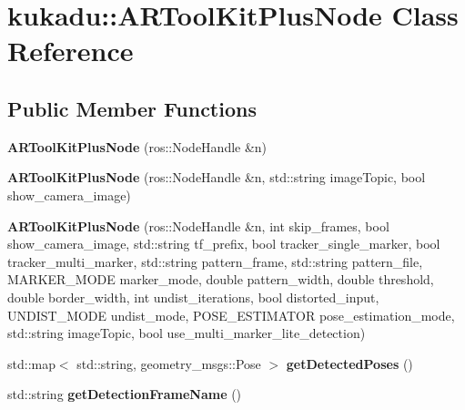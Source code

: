 \hypertarget{classkukadu_1_1ARToolKitPlusNode}{}\section{kukadu\+:\+:A\+R\+Tool\+Kit\+Plus\+Node Class Reference}
\label{classkukadu_1_1ARToolKitPlusNode}
\subsection*{Public Member Functions}
\begin{DoxyCompactItemize}
\item 
{\bfseries A\+R\+Tool\+Kit\+Plus\+Node} (ros\+::\+Node\+Handle \&n)\hypertarget{classkukadu_1_1ARToolKitPlusNode_af59f135659c7c82497b4206cdb257069}{}\label{classkukadu_1_1ARToolKitPlusNode_af59f135659c7c82497b4206cdb257069}

\item 
{\bfseries A\+R\+Tool\+Kit\+Plus\+Node} (ros\+::\+Node\+Handle \&n, std\+::string image\+Topic, bool show\+\_\+camera\+\_\+image)\hypertarget{classkukadu_1_1ARToolKitPlusNode_abd9a833fe8465b6e3ad8517432a86dd5}{}\label{classkukadu_1_1ARToolKitPlusNode_abd9a833fe8465b6e3ad8517432a86dd5}

\item 
{\bfseries A\+R\+Tool\+Kit\+Plus\+Node} (ros\+::\+Node\+Handle \&n, int skip\+\_\+frames, bool show\+\_\+camera\+\_\+image, std\+::string tf\+\_\+prefix, bool tracker\+\_\+single\+\_\+marker, bool tracker\+\_\+multi\+\_\+marker, std\+::string pattern\+\_\+frame, std\+::string pattern\+\_\+file, M\+A\+R\+K\+E\+R\+\_\+\+M\+O\+DE marker\+\_\+mode, double pattern\+\_\+width, double threshold, double border\+\_\+width, int undist\+\_\+iterations, bool distorted\+\_\+input, U\+N\+D\+I\+S\+T\+\_\+\+M\+O\+DE undist\+\_\+mode, P\+O\+S\+E\+\_\+\+E\+S\+T\+I\+M\+A\+T\+OR pose\+\_\+estimation\+\_\+mode, std\+::string image\+Topic, bool use\+\_\+multi\+\_\+marker\+\_\+lite\+\_\+detection)\hypertarget{classkukadu_1_1ARToolKitPlusNode_aa166bd1ebd987ecf4e7d312f9e9b1033}{}\label{classkukadu_1_1ARToolKitPlusNode_aa166bd1ebd987ecf4e7d312f9e9b1033}

\item 
std\+::map$<$ std\+::string, geometry\+\_\+msgs\+::\+Pose $>$ {\bfseries get\+Detected\+Poses} ()\hypertarget{classkukadu_1_1ARToolKitPlusNode_a30eec7d870fb10233aadc39505a36579}{}\label{classkukadu_1_1ARToolKitPlusNode_a30eec7d870fb10233aadc39505a36579}

\item 
std\+::string {\bfseries get\+Detection\+Frame\+Name} ()\hypertarget{classkukadu_1_1ARToolKitPlusNode_a2133a9697a70994291b491587722c827}{}\label{classkukadu_1_1ARToolKitPlusNode_a2133a9697a70994291b491587722c827}

\end{DoxyCompactItemize}



